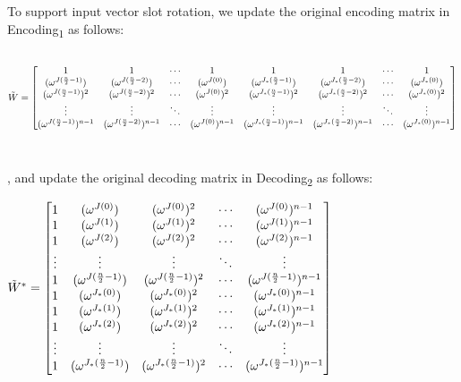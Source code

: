 \begin{tcolorbox}[title={\textbf{\tboxlabel{\ref*{subsec:bfv-rotation}} BFV's Homomorphic Rotation of Input Vector Slots}}]

To support input vector slot rotation, we update the original encoding matrix in \textsf{Encoding\textsubscript{1}} as follows: 

$ $

{\footnotesize{\noindent $\tilde{W} = \begin{bmatrix}
1 & 1 & \cdots & 1 & 1 & 1 & \cdots & 1\\
(\omega^{J(\frac{n}{2} - 1)}) & (\omega^{J(\frac{n}{2} - 2)}) & \cdots & (\omega^{J(0)}) & (\omega^{J_*(\frac{n}{2} - 1)}) & (\omega^{J_*(\frac{n}{2} - 2)}) & \cdots & (\omega^{J_*(0)})\\
(\omega^{J(\frac{n}{2} - 1)})^2 & (\omega^{J(\frac{n}{2} - 2)})^2 & \cdots & (\omega^{J(0)})^2 & (\omega^{J_*(\frac{n}{2} - 1)})^2 & (\omega^{J_*(\frac{n}{2} - 2)})^2 & \cdots & (\omega^{J_*(0)})^2 \\
\vdots & \vdots & \ddots & \vdots & \vdots & \vdots & \ddots & \vdots \\
(\omega^{J(\frac{n}{2} - 1)})^{n-1} & (\omega^{J(\frac{n}{2} - 2)})^{n-1} & \cdots & (\omega^{J(0)})^{n-1} & (\omega^{J_*(\frac{n}{2} - 1)})^{n-1} & (\omega^{J_*(\frac{n}{2} - 2)})^{n-1} & \cdots  & (\omega^{J_*(0)})^{n-1}
\end{bmatrix}$}}

$ $

$ $


, and update the original decoding matrix in \textsf{Decoding\textsubscript{2}} as follows:

$\tilde{W}^* = \begin{bmatrix}
1 & (\omega^{J(0)}) & (\omega^{J(0)})^2 & \cdots & (\omega^{J(0)})^{n-1}\\
1 & (\omega^{J(1)}) & (\omega^{J(1)})^2 & \cdots & (\omega^{J(1)})^{n-1}\\
1 & (\omega^{J(2)}) & (\omega^{J(2)})^2 & \cdots & (\omega^{J(2)})^{n-1}\\
\vdots & \vdots & \vdots & \ddots & \vdots \\
1 & (\omega^{J(\frac{n}{2}-1)}) & (\omega^{J(\frac{n}{2}-1)})^2 & \cdots & (\omega^{J(\frac{n}{2}-1)})^{n-1}\\
1 & (\omega^{J_*(0)}) & (\omega^{J_*(0)})^2 & \cdots & (\omega^{J_*(0)})^{n-1}\\
1 & (\omega^{J_*(1)}) & (\omega^{J_*(1)})^2 & \cdots & (\omega^{J_*(1)})^{n-1}\\
1 & (\omega^{J_*(2)}) & (\omega^{J_*(2)})^2 & \cdots & (\omega^{J_*(2)})^{n-1}\\
\vdots & \vdots & \vdots & \ddots & \vdots \\
1 & (\omega^{J_*(\frac{n}{2}-1)}) & (\omega^{J_*(\frac{n}{2}-1)})^2 & \cdots & (\omega^{J_*(\frac{n}{2}-1)})^{n-1}\\
\end{bmatrix}$


\end{tcolorbox}
